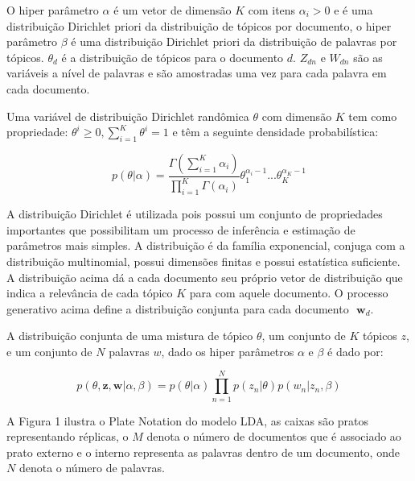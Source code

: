 \documentclass[12pt,a4paper]{article}
\begin{document}
O  hiper parâmetro $\alpha$ é um vetor de dimensão $K$ com itens \(\alpha _i>0\) e é uma distribuição Dirichlet priori da distribuição de tópicos por documento, o hiper parâmetro $\beta$ é uma distribuição Dirichlet priori da distribuição de palavras por tópicos. $\theta _d$ é a distribuição de tópicos para o documento $d$. $Z_{dn}$ e $W_{dn}$ são as variáveis a nível de palavras e são amostradas uma vez para cada palavra em cada documento.

Uma variável de distribuição Dirichlet randômica $\theta$ com dimensão $K$ tem como propriedade: $\theta ^i \geq 0, \displaystyle\sum_{i=1}^{K} \theta ^i = 1$ e têm a seguinte densidade probabilística:

\begin{equation}
p(\theta|\alpha) = \frac{\Gamma(\displaystyle\sum_{i=1}^{K} \alpha _i)}{\displaystyle\prod_{i=1}^{K} \Gamma(\alpha _i)} \theta _1 ^{\alpha _i - 1} ...  \theta _K ^{\alpha _K - 1}
\end{equation}

A distribuição Dirichlet é utilizada pois possui um conjunto de propriedades importantes que possibilitam um processo de inferência e estimação de parâmetros mais simples. A distribuição é da família exponencial, conjuga com a distribuição multinomial, possui dimensões finitas e possui estatística suficiente. A distribuição  acima dá a cada documento seu próprio vetor de distribuição que indica a relevância de cada tópico $K$ para com aquele documento. O processo generativo acima define a distribuição conjunta para cada documento $\textbf{ w}_d$.

A distribuição conjunta de uma mistura de tópico $\theta$, um conjunto de $K$ tópicos $z$, e um conjunto de $N$ palavras $w$, dado os hiper parâmetros $\alpha$ e $\beta$ é dado por:


\begin{equation}
p(\theta,\textbf{z},\textbf{w}|\alpha,\beta) = p(\theta|\alpha) \prod_{n=1}^{N} p(z_n|\theta)p(w_n|z_n,\beta)
\end{equation}


A Figura 1 ilustra o Plate Notation do modelo LDA, as caixas são pratos representando réplicas, o $M$ denota o número de documentos que é associado ao prato externo e o interno representa as palavras dentro de um documento, onde $N$ denota o número de palavras.
\end{document}
